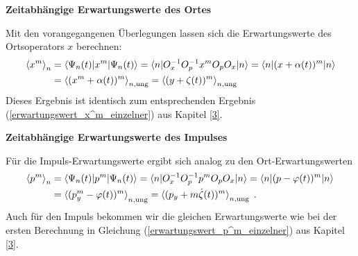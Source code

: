   \textbf{Zeitabhängige Erwartungswerte des Ortes}

  Mit den vorangegangenen Überlegungen lassen sich die Erwartungswerte des Ortsoperators $x$ berechnen:
  \begin{align}
    \braket{x^m}_n&=\braket{\Psi_n(t)|x^m|\Psi_n(t)}=\braket{n|O_x^{-1}O_p^{-1}x^mO_pO_x|n}=\braket{n|(x+\alpha(t))^m|n}\notag\\
    &=\braket{(x^m+\alpha(t))^m}_{n,\text{ung}}
    =\braket{(y+\zeta(t))^m}_{n,\text{ung}}
  \end{align}
  Dieses Ergebnis ist identisch zum entsprechenden Ergebnis (\ref{erwartungswert_x^m_einzelner}) aus Kapitel \ref{3}.

  \textbf{Zeitabhängige Erwartungswerte des Impulses}

  Für die Impuls-Erwartungswerte ergibt sich analog zu den Ort-Erwartungswerten
  \begin{align}
    \braket{p^m}_n&=\braket{\Psi_n(t)|p^m|\Psi_n(t)}=\braket{n|O_x^{-1}O_p^{-1}p^mO_pO_x|n}=\braket{n|(p-\varphi(t))^m|n}\notag\\
    &=\braket{(p_y^m-\varphi(t))^m}_{n,\text{ung}}
    =\braket{(p_y+m\dot\zeta(t))^m}_{n,\text{ung}} \;.
  \end{align}
  Auch für den Impuls bekommen wir die gleichen Erwartungswerte wie bei der ersten Berechnung in Gleichung (\ref{erwartungswert_p^m_einzelner}) aus Kapitel \ref{3}.

